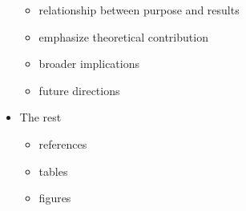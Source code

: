 \documentclass[11pt]{article}
\begin{document}
\begin{itemize}
\begin{itemize}
\item relationship between purpose and results
\item emphasize theoretical contribution
\item broader implications
\item future directions
\end{itemize}
\item The rest
\begin{itemize}
\item references
\item tables
\item figures
\end{itemize}
\end{itemize}
\end{document}
